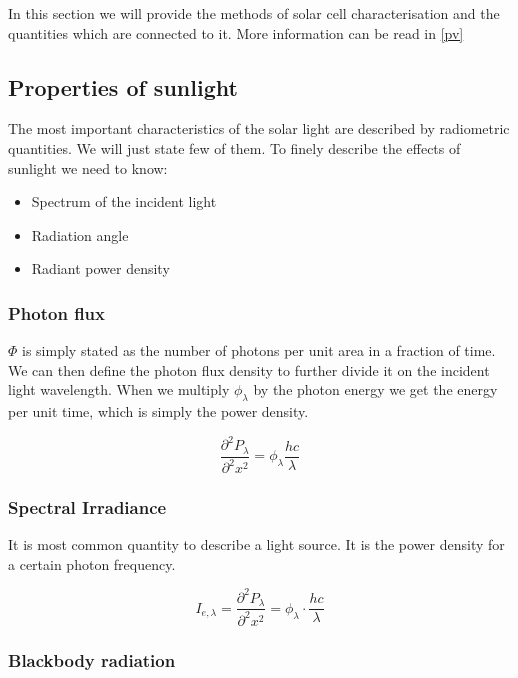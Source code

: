 In this section we will provide the methods of solar cell characterisation and the quantities which are connected to it. More information can be read in \ref{pv}

\subsection{Properties of sunlight}

The most important characteristics of the solar light are described by radiometric quantities. We will just state few of them. To finely describe the effects of sunlight we need to know:

\begin{itemize}
\item Spectrum of the incident light
\item Radiation angle
\item Radiant power density
\end{itemize}

\subsubsection{Photon flux}
$\Phi$ is simply stated as the number of photons per unit area in a fraction of time. We can then define the photon flux density to further divide it on the incident light wavelength. When we multiply $\phi _{\lambda } $ by the photon energy we get the energy per unit time, which is simply the power density. 

\begin{equation}
\frac{\partial ^2 P_\lambda }{\partial ^2 x^2} = \phi _ {\lambda } \frac{hc}{\lambda }
\end{equation}

\subsubsection{Spectral Irradiance}

It is most common quantity to describe a light source. It is the power density for a certain photon frequency. 

\begin{equation}
I_{e,\lambda } = \frac{\partial ^2 P_\lambda }{\partial ^2 x^2} = \phi_\lambda \cdot \frac{hc}{\lambda }
\end{equation}

\subsubsection{Blackbody radiation}

